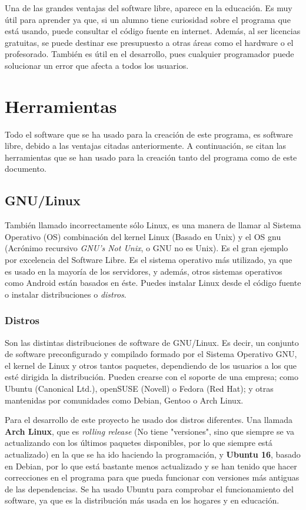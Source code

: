 \documentclass[a4paper, 11pt]{report} %
\begin{document}
Una de las grandes ventajas del software libre, aparece en la educación. Es muy útil para aprender ya que, si un alumno tiene curiosidad sobre el programa que está usando, puede consultar el código fuente en internet. Además, al ser licencias gratuitas, se puede destinar ese presupuesto a otras áreas como el hardware o el profesorado. También es útil en el desarrollo, pues cualquier programador puede solucionar un error que afecta a todos los usuarios.

\section{Herramientas}
Todo el software que se ha usado para la creación de este programa, es software libre, debido a las ventajas citadas anteriormente. A continuación, se citan las herramientas que se han usado para la creación tanto del programa como de este documento.

\subsection{GNU/Linux}
También llamado incorrectamente sólo Linux, es una manera de llamar al Sistema Operativo (OS) combinación del kernel Linux (Basado en Unix) y el OS \acrshort{gnu} (Acrónimo recursivo \textit{GNU's Not Unix}, o GNU no es Unix). Es el gran ejemplo por excelencia del Software Libre. Es el sistema operativo más utilizado, ya que es usado en la mayoría de los servidores, y además, otros sistemas operativos como Android están basados en éste. Puedes instalar Linux desde el código fuente o instalar distribuciones o \textit{distros}.

\subsubsection{Distros}
Son las distintas distribuciones de software de GNU/Linux. Es decir, un conjunto de software preconfigurado y compilado formado por el Sistema Operativo GNU, el kernel de Linux y otros tantos paquetes, dependiendo de los usuarios a los que esté dirigida la distribución. Pueden crearse con el soporte de una empresa; como Ubuntu (Canonical Ltd.), openSUSE (Novell) o Fedora (Red Hat); y otras mantenidas por comunidades como Debian, Gentoo o Arch Linux.

Para el desarrollo de este proyecto he usado dos distros diferentes. Una llamada \textbf{Arch Linux}, que es \textit{rolling release} (No tiene "versiones", sino que siempre se va actualizando con los últimos paquetes disponibles, por lo que siempre está actualizado) en la que se ha ido haciendo la programación, y \textbf{Ubuntu 16}, basado en Debian, por lo que está bastante menos actualizado y se han tenido que hacer correcciones en el programa para que pueda funcionar con versiones más antiguas de las \glspl{dependencia}. Se ha usado Ubuntu para comprobar el funcionamiento del software, ya que es la distribución más usada en los hogares y en educación.
\end{document}
